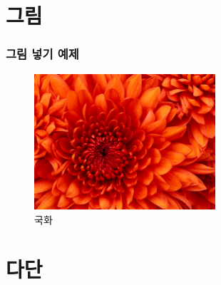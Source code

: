 \documentclass[10pt,blue,xcolor=pdftex,dvipsnames,table,handout]{beamer}
\begin{document}
		\section{그림}
		\begin{frame}
		\frametitle{그림 넣기 예제}
			\begin{figure}
			\includegraphics[scale=1.0,width=0.6\textwidth]{./fig/Chrysanthemum.jpg}
			\caption{국화}
			\end{figure}
		\end{frame}







		\section{다단}
\end{document}
